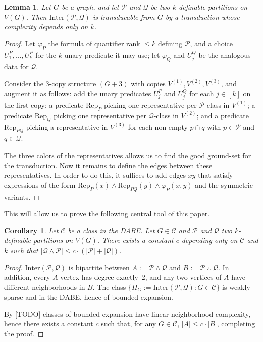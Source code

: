 \documentclass[11pt]{article}
\newtheorem{corollary}[theorem]{Corollary}
\newtheorem{lemma}{Lemma}
\theoremstyle{definition}
\newcommand{\CC}{{\mathscr C}}
\renewcommand{\leq}{\leqslant}
\renewcommand{\le}{\leqslant}
\let\phi\varphi
\newcommand{\Pp}{\mathcal{P}}
\newcommand{\Qq}{\mathcal{Q}}
\begin{document}
\begin{lemma}\label{lem:transInter}
    Let $G$ be a graph, and let $\mathcal P$ and $\mathcal Q$ be two $k$-definable partitions on $V(G)$. Then $\text{Inter}(\Pp , \Qq)$ is transducable from $G$ by a transduction whose complexity depends only on $k$.
\end{lemma}
\begin{proof}

Let $\phi_P$ the formula of quantifier rank $\leq k$ defining $\mathcal P$, and a choice $U_1^P, \ldots, U_k^P$ for the $k$ unary predicate it may use; let $\phi_Q$ and $U_j^Q$ be the analogous data for $\mathcal Q$.

Consider the $3$-copy structure $(G+3)$ with copies $V^{(1)}, V^{(2)}, V^{(3)}$, and augment it as follows: add the unary predicates $U_j^P$ and $U_j^Q$ for each $j \in [k]$ on the first copy; a predicate $\mathrm{Rep}_P$ picking one representative per $\mathcal P$-class in $V^{(1)}$; a predicate $\mathrm{Rep}_Q$ picking one representative per $\mathcal Q$-class in $V^{(2)}$; and a predicate $\mathrm{Rep}_{PQ}$ picking a representative in $V^{(3)}$ for each non-empty $p \cap q$ with $p \in \mathcal P$ and $q \in \mathcal Q$.

The three colors of the representatives allows us to find the good ground-set for the transduction. Now it remains to define the edges between these representatives.
In order to do this, it suffices to add edges $xy$ that satisfy expressions of the form $\mathrm{Rep}_{P}(x) \wedge \mathrm{Rep}_{PQ}(y) \wedge \phi_P(x, y)$ and the symmetric variants.
\end{proof}

This will allow us to prove the following central tool of this paper.

\begin{corollary}\label{cor:2equiv_ref}
    Let $\CC$ be a class in the DABE.
    Let $G \in \CC$ and $\Pp$ and $\Qq$ two $k$-definable partitions on $V(G)$.
    There exists a constant $c$ depending only on $\CC$ and $k$ such that $|\Qq \wedge \Pp| \le c \cdot (|\Pp| + |\Qq|)$.
\end{corollary}
\begin{proof}
$\text{Inter}(\Pp, \Qq)$ is bipartite between $A := \Pp \wedge \Qq$ and $B := \Pp \uplus \Qq$. In addition, every $A$-vertex has degree exactly~$2$, and any two vertices of $A$ have different neighborhoods in $B$. The class $\{H_G := \text{Inter}(\Pp,\Qq) : G \in \CC\}$ is weakly sparse and in the DABE, hence of bounded expansion.

By [TODO] classes of bounded expansion have linear neighborhood complexity, hence there exists a constant $c$ such that, for any $G \in \CC$, $|A| \le c \cdot |B|$, completing the proof.
\end{proof}
\end{document}
